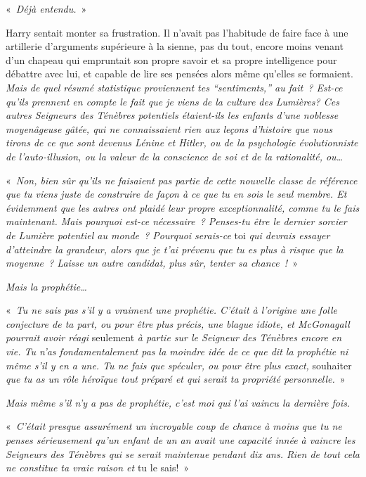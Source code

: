 «~\emph{Déjà entendu.}~»

Harry sentait monter sa frustration.
Il n'avait pas l'habitude de faire face à une artillerie d'arguments supérieure à la sienne, pas du tout, encore moins venant d'un chapeau qui empruntait son propre savoir et sa propre intelligence pour débattre avec lui, et capable de lire ses pensées alors même qu'elles se formaient.
\emph{Mais de quel résumé statistique proviennent tes “sentiments,” au fait~?
Est-ce qu'ils prennent en compte le fait que je viens de la culture des Lumières?
Ces autres Seigneurs des Ténèbres potentiels étaient-ils les enfants d'une noblesse moyenâgeuse gâtée, qui ne connaissaient rien aux leçons d'histoire que nous tirons de ce que sont devenus Lénine et Hitler, ou de la psychologie évolutionniste de l'auto-illusion, ou la valeur de la conscience de soi et de la rationalité, ou…}

«~\emph{Non, bien sûr qu'ils ne faisaient pas partie de cette nouvelle classe de référence que tu viens juste de construire de façon à ce que tu en sois le seul membre.
Et évidemment que les autres ont plaidé leur propre exceptionnalité, comme tu le fais maintenant.
Mais pourquoi est-ce nécessaire~?
Penses-tu être le dernier sorcier de Lumière potentiel au monde~?
Pourquoi serais-ce} toi \emph{qui devrais essayer d'atteindre la grandeur, alors que je t'ai prévenu que tu es plus à risque que la moyenne~?
Laisse un autre candidat, plus sûr, tenter sa chance~!}~»

\emph{Mais la prophétie…}

«~\emph{Tu ne sais pas s'il y a vraiment une prophétie.
C'était à l'origine une folle conjecture de ta part, ou pour être plus précis, une blague idiote, et McGonagall pourrait avoir réagi} seulement \emph{à partie sur le Seigneur des Ténèbres encore en vie.
Tu n'as fondamentalement pas la moindre idée de ce que dit la prophétie ni même s'il y en a une.
Tu ne fais que spéculer, ou pour être plus exact,} souhaiter \emph{que tu as un rôle héroïque tout préparé et qui serait ta propriété personnelle.}~»

\emph{Mais même s'il n'y a pas de prophétie, c'est moi qui l'ai vaincu la dernière fois.}

«~\emph{C'était presque assurément un incroyable coup de chance à moins que tu ne penses sérieusement qu'un enfant de un an avait une capacité innée à vaincre les Seigneurs des Ténèbres qui se serait maintenue pendant dix ans.
Rien de tout cela ne constitue ta vraie raison et} tu le sais!~»

